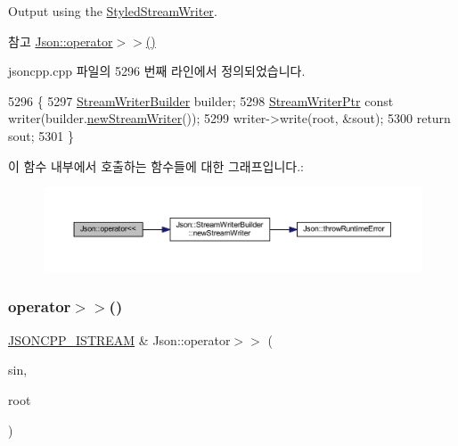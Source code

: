 Output using the \hyperlink{class_json_1_1_styled_stream_writer}{Styled\+Stream\+Writer}. 

\begin{DoxySeeAlso}{참고}
\hyperlink{namespace_json_a244ed0996aba750c40c1641c06bba449}{Json\+::operator$>$$>$()} 
\end{DoxySeeAlso}


jsoncpp.\+cpp 파일의 5296 번째 라인에서 정의되었습니다.


\begin{DoxyCode}
5296                                                                       \{
5297   \hyperlink{class_json_1_1_stream_writer_builder}{StreamWriterBuilder} builder;
5298   \hyperlink{namespace_json_a7132404aeebfc96d7c6ad2c66260afb5}{StreamWriterPtr} \textcolor{keyword}{const} writer(builder.\hyperlink{class_json_1_1_stream_writer_builder_ab9ee278609f88ae04a7c1a84e1f559e6}{newStreamWriter}());
5299   writer->write(root, &sout);
5300   \textcolor{keywordflow}{return} sout;
5301 \}
\end{DoxyCode}
이 함수 내부에서 호출하는 함수들에 대한 그래프입니다.\+:\nopagebreak
\begin{figure}[H]
\begin{center}
\leavevmode
\includegraphics[width=350pt]{namespace_json_a975d1dbca8aa7a06f38d373edcb9081c_cgraph}
\end{center}
\end{figure}
\mbox{\label{namespace_json_a244ed0996aba750c40c1641c06bba449}} 
\subsubsection{\texorpdfstring{operator$>$$>$()}{operator>>()}}
{\footnotesize\ttfamily \hyperlink{json_8h_a15f2f70b2ce0a2abd0f8112393dbc4de}{J\+S\+O\+N\+C\+P\+P\+\_\+\+I\+S\+T\+R\+E\+AM} \& Json\+::operator$>$$>$ (\begin{DoxyParamCaption}\item[{\hyperlink{json_8h_a15f2f70b2ce0a2abd0f8112393dbc4de}{J\+S\+O\+N\+C\+P\+P\+\_\+\+I\+S\+T\+R\+E\+AM} \&}]{sin,  }\item[{\hyperlink{class_json_1_1_value}{Value} \&}]{root }\end{DoxyParamCaption})}



